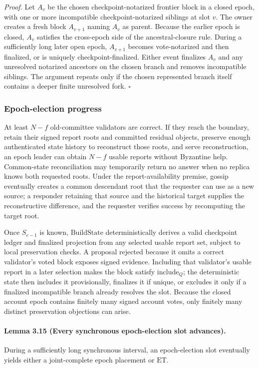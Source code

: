 \documentclass[10pt,twocolumn]{article}
\newcommand{\ET}{\mathrm{ET}}
\newcommand{\Include}{\mathrm{include}}
\newcommand{\BuildState}{\mathrm{BuildState}}
\begin{document}
\emph{Proof.} Let $A_v$ be the chosen checkpoint-notarized frontier block in a closed epoch, with one or more incompatible checkpoint-notarized siblings at slot $v$. The owner creates a fresh block $A_{v+1}$ naming $A_v$ as parent. Because the earlier epoch is closed, $A_v$ satisfies the cross-epoch side of the ancestral-closure rule. During a sufficiently long later open epoch, $A_{v+1}$ becomes vote-notarized and then finalized, or is uniquely checkpoint-finalized. Either event finalizes $A_v$ and any unresolved notarized ancestors on the chosen branch and removes incompatible siblings. The argument repeats only if the chosen represented branch itself contains a deeper finite unresolved fork. $\square$

\subsubsection{Epoch-election progress}
At least $N-f$ old-committee validators are correct. If they reach the boundary, retain their signed report roots and committed residual objects, preserve enough authenticated state history to reconstruct those roots, and serve reconstruction, an epoch leader can obtain $N-f$ usable reports without Byzantine help. Common-state reconciliation may temporarily return no answer when no replica knows both requested roots. Under the report-availability premise, gossip eventually creates a common descendant root that the requester can use as a new source; a responder retaining that source and the historical target supplies the reconstructive difference, and the requester verifies success by recomputing the target root.

Once $S_{e-1}$ is known, $\BuildState$ deterministically derives a valid checkpoint ledger and finalized projection from any selected usable report set, subject to local preservation checks. A proposal rejected because it omits a correct validator's voted block exposes signed evidence. Including that validator's usable report in a later selection makes the block satisfy $\Include_Q$; the deterministic state then includes it provisionally, finalizes it if unique, or excludes it only if a finalized incompatible branch already resolves the slot. Because the closed account epoch contains finitely many signed account votes, only finitely many distinct preservation objections can arise.

\paragraph{Lemma 3.15 (Every synchronous epoch-election slot advances).} During a sufficiently long synchronous interval, an epoch-election slot eventually yields either a joint-complete epoch placement or $\ET$.
\end{document}
